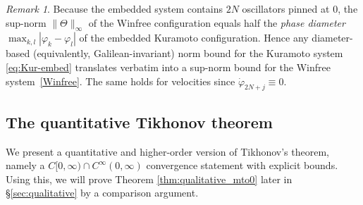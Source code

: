 \documentclass[11pt,reqno]{amsart}
\newcounter{name}
\theoremstyle{definition}
\theoremstyle{remark}
\newtheorem{remark}[lemma]{Remark}
\begin{document}
\begin{remark}\label{rmk:diam-sup}
Because the embedded system contains $2N$ oscillators pinned at $0$,
the sup-norm $\|\Theta\|_\infty$ of the Winfree configuration equals
half the \emph{phase diameter} $\max_{k,l}|\varphi_k-\varphi_l|$ of the
embedded Kuramoto configuration. Hence any
diameter-based (equivalently, Galilean-invariant) norm bound for the
Kuramoto system \eqref{eq:Kur-embed} translates verbatim into a
sup-norm bound for the Winfree system~\eqref{Winfree}. The same holds
for velocities since $\dot\varphi_{2N+j}\equiv 0$.
\end{remark}

\subsection{The quantitative Tikhonov theorem}

We present a quantitative and higher-order version of Tikhonov's theorem, namely a $C[0,\infty)\cap C^\infty(0,\infty)$ convergence statement with explicit bounds. Using this, we will prove Theorem \ref{thm:qualitative_mto0} later in \S\ref{sec:qualitative} by a comparison argument.
\end{document}
